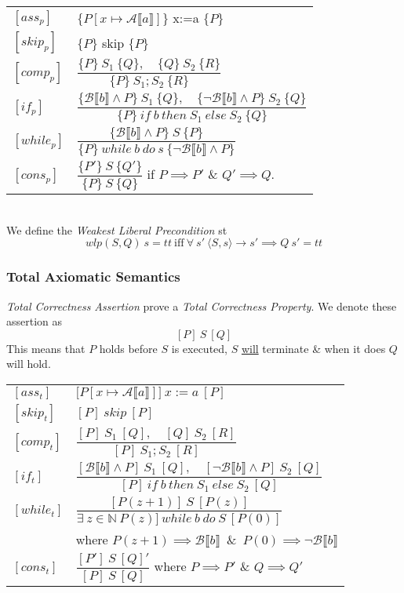 \documentclass[11pt,a4paper]{article}
\begin{document}
\begin{tabular}{ll}
$[ass_p]$&$\{P[x\mapsto\mathcal{A}\llbracket a\rrbracket]\}$ x:=a $\{P\}$\\
$[skip_p]$&$\{P\}$ skip $\{P\}$\\
$[comp_p]$&$\dfrac{\{P\}\ S_1\ \{Q\},\quad\{Q\}\ S_2\ \{R\}}{\{P\}\ S_1;S_2\ \{R\}}$\\
$[if_p]$&$\dfrac{\{\mathcal{B}\llbracket b\rrbracket\wedge P\}\ S_1\ \{Q\},\quad\{\neg\mathcal{B}\llbracket b\rrbracket\wedge P\}\ S_2\ \{Q\}}{\{P\}\ if\ b\ then\ S_1\ else\ S_2\ \{Q\}}$\\
$[while_p]$&$\dfrac{\{\mathcal{B}\llbracket b\rrbracket\wedge P\}\ S\ \{P\}}{\{P\}\ while\ b\ do\ s\ \{\neg\mathcal{B}\llbracket b\rrbracket\wedge P\}}$\\
$[cons_p]$&$\dfrac{\{P'\}\ S\ \{Q'\}}{\{P\}\ S\ \{Q\}}$ if $P\implies P'$ \& $Q'\implies Q$.\\
\end{tabular}\\

We define the \textit{Weakest Liberal Precondition} st
$$wlp(S,Q)\ s=tt\ \mathrm{iff}\ \forall\ s'\ \langle S,s\rangle\to s'\implies Q\ s'=tt$$

\subsubsection{Total Axiomatic Semantics}

\textit{Total Correctness Assertion} prove a \textit{Total Correctness Property}. We denote these assertion as
$$[P]\ S\ [Q]$$
This means that $P$ holds before $S$ is executed, $S$ \underline{will} terminate \& when it does $Q$ will hold.\\

\begin{tabular}{ll}
$[ass_t]$&$\big[P[x\mapsto\mathcal{A}\llbracket a\rrbracket]\big]\ x:=a\ [P]$\\
$[skip_t]$&$[P]\ skip\ [P]$\\
$[comp_t]$&$\dfrac{[P]\ S_1\ [Q],\quad[Q]\ S_2\ [R]}{[P]\ S_1;S_2\ [R]}$\\
$[if_t]$&$\dfrac{[\mathcal{B}\llbracket b\rrbracket\wedge P]\ S_1\ [Q],\quad[\neg\mathcal{B}\llbracket b\rrbracket\wedge P]\ S_2\ [Q]}{[P]\ if\ b\ then\ S_1\ else\ S_2\ [Q]}$\\
$[while_t]$&$\dfrac{[P(z+1)]\ S\ [P(z)]}{\exists\ z\in\mathbb{N}\ P(z)]\ while\ b\ do\ S\ [P(0)]}$\\
&where $P(z+1)\implies\mathcal{B}\llbracket b\rrbracket$\ \&\ $P(0)\implies\neg\mathcal{B}\llbracket b\rrbracket$\\
$[cons_t]$&$\dfrac{[P']\ S\ [Q]'}{[P]\ S\ [Q]}$ where $P\implies P'$ \& $Q\implies Q'$
\end{tabular}\\
\end{document}
